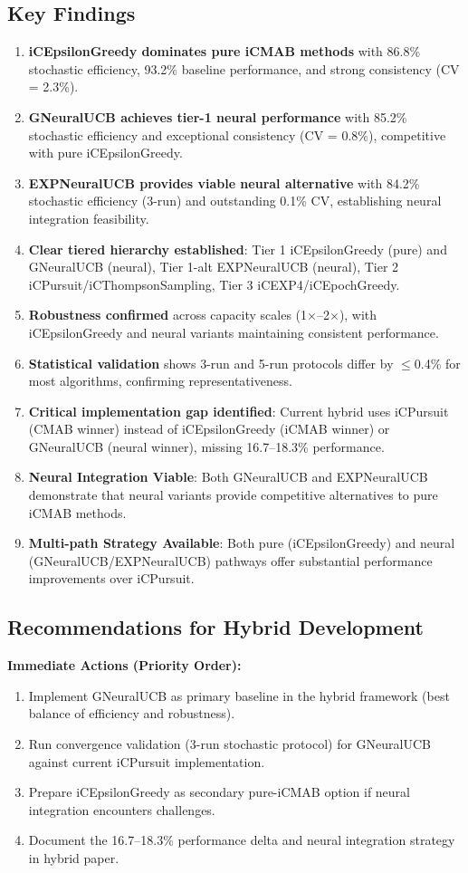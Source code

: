 \documentclass[12pt,a4paper]{article}
\newcommand{\primarytext}[1]{\textcolor{primaryblue}{\textbf{#1}}}
\newcommand{\secondarytext}[1]{\textcolor{secondaryblue}{\textbf{#1}}}
\newcommand{\success}[1]{\textcolor{accentgreen}{\textbf{#1}}}
\newcommand{\warning}[1]{\textcolor{warningred}{\textbf{#1}}}
\newcommand{\legacy}[1]{\textcolor{legacycolor}{\textbf{#1}}}
\newcommand{\neural}[1]{\textcolor{neuralcolor}{\textbf{#1}}}
\begin{document}
\subsection{Key Findings}
\begin{enumerate}
\item \primarytext{iCEpsilonGreedy dominates pure iCMAB methods} with 86.8\% stochastic efficiency, 93.2\% baseline performance, and strong consistency (CV = 2.3\%).
\item \neural{GNeuralUCB achieves tier-1 neural performance} with 85.2\% stochastic efficiency and exceptional consistency (CV = 0.8\%), competitive with pure iCEpsilonGreedy.
\item \legacy{EXPNeuralUCB provides viable neural alternative} with 84.2\% stochastic efficiency (3-run) and outstanding 0.1\% CV, establishing neural integration feasibility.
\item \secondarytext{Clear tiered hierarchy established}: Tier 1 iCEpsilonGreedy (pure) and GNeuralUCB (neural), Tier 1-alt EXPNeuralUCB (neural), Tier 2 iCPursuit/iCThompsonSampling, Tier 3 iCEXP4/iCEpochGreedy.
\item \success{Robustness confirmed} across capacity scales (1$\times$--2$\times$), with iCEpsilonGreedy and neural variants maintaining consistent performance.
\item \success{Statistical validation} shows 3-run and 5-run protocols differ by $\leq$0.4\% for most algorithms, confirming representativeness.
\item \warning{Critical implementation gap identified}: Current hybrid uses iCPursuit (CMAB winner) instead of iCEpsilonGreedy (iCMAB winner) or GNeuralUCB (neural winner), missing 16.7--18.3\% performance.
\item \neural{Neural Integration Viable}: Both GNeuralUCB and EXPNeuralUCB demonstrate that neural variants provide competitive alternatives to pure iCMAB methods.
\item \success{Multi-path Strategy Available}: Both pure (iCEpsilonGreedy) and neural (GNeuralUCB/EXPNeuralUCB) pathways offer substantial performance improvements over iCPursuit.
\end{enumerate}

\subsection{Recommendations for Hybrid Development}

\textbf{Immediate Actions (Priority Order):}
\begin{enumerate}
\item Implement GNeuralUCB as primary baseline in the hybrid framework (best balance of efficiency and robustness).
\item Run convergence validation (3-run stochastic protocol) for GNeuralUCB against current iCPursuit implementation.
\item Prepare iCEpsilonGreedy as secondary pure-iCMAB option if neural integration encounters challenges.
\item Document the 16.7--18.3\% performance delta and neural integration strategy in hybrid paper.
\end{enumerate}
\end{document}
